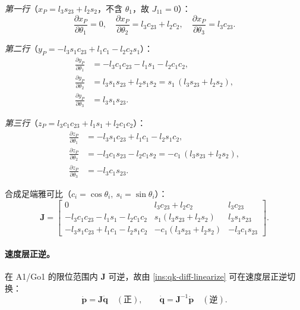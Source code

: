 \emph{第一行}（$x_P=l_3 s_{23}+l_2 s_2$，不含 $\theta_1$，故 $J_{11}=0$）：
\begin{equation}
  \frac{\partial x_P}{\partial\theta_1}=0,\quad
  \frac{\partial x_P}{\partial\theta_2}=l_3 c_{23}+l_2 c_2,\quad
  \frac{\partial x_P}{\partial\theta_3}=l_3 c_{23}.
  \label{eq:qk-jacobian-row1}
\end{equation}

\emph{第二行}（$y_P=-l_3 s_1 c_{23}+l_1 c_1-l_2 c_2 s_1$）：
\begin{equation}
  \begin{aligned}
  \frac{\partial y_P}{\partial\theta_1}&=-l_3 c_1 c_{23}-l_1 s_1-l_2 c_1 c_2,\\
  \frac{\partial y_P}{\partial\theta_2}&=l_3 s_1 s_{23}+l_2 s_1 s_2=s_1\,(l_3 s_{23}+l_2 s_2),\\
  \frac{\partial y_P}{\partial\theta_3}&=l_3 s_1 s_{23}.
  \end{aligned}
  \label{eq:qk-jacobian-row2}
\end{equation}

\emph{第三行}（$z_P=l_3 c_1 c_{23}+l_1 s_1+l_2 c_1 c_2$）：
\begin{equation}
  \begin{aligned}
  \frac{\partial z_P}{\partial\theta_1}&=-l_3 s_1 c_{23}+l_1 c_1-l_2 s_1 c_2,\\
  \frac{\partial z_P}{\partial\theta_2}&=-l_3 c_1 s_{23}-l_2 c_1 s_2=-c_1\,(l_3 s_{23}+l_2 s_2),\\
  \frac{\partial z_P}{\partial\theta_3}&=-l_3 c_1 s_{23}.
  \end{aligned}
  \label{eq:qk-jacobian-row3}
\end{equation}

合成足端雅可比（$c_i{=}\cos\theta_i,\ s_i{=}\sin\theta_i$）\cite{unitree2023quadruped}：
\begin{equation}
  \mathbf{J}=\begin{bmatrix}
  0 & l_3 c_{23}+l_2 c_2 & l_3 c_{23}\\[2pt]
  -l_3 c_1 c_{23}-l_1 s_1-l_2 c_1 c_2 & s_1(l_3 s_{23}+l_2 s_2) & l_3 s_1 s_{23}\\[2pt]
  -l_3 s_1 c_{23}+l_1 c_1-l_2 s_1 c_2 & -c_1(l_3 s_{23}+l_2 s_2) & -l_3 c_1 s_{23}
  \end{bmatrix}.
  \label{eq:qk-jacobian-full}
\end{equation}

\paragraph{速度层正逆。}
在 A1/Go1 的限位范围内 $\mathbf{J}$ 可逆，故由 \cref{ins:qk-diff-linearize} 可在速度层正逆切换\cite{unitree2023quadruped}：
\begin{equation}
  \dot{\boldsymbol{p}}=\mathbf{J}\dot{\boldsymbol{q}}\quad(\text{正}),
  \qquad
  \dot{\boldsymbol{q}}=\mathbf{J}^{-1}\dot{\boldsymbol{p}}\quad(\text{逆}).
  \label{eq:qk-jacobian-invert}
\end{equation}

